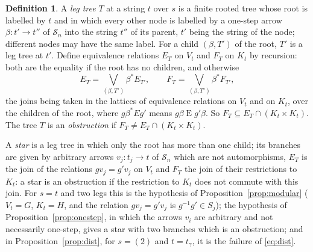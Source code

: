 \documentclass[11pt]{amsart}
\theoremstyle{definition}
\newtheorem{defi}[thm]{Definition}
\newcommand{\cS}{\mathcal S}
\begin{document}
\begin{defi}\label{def:tree}
A \emph{leg tree} $T$ at a string $t$ over $s$ is a finite rooted tree
whose root is labelled by $t$ and in which every other node is
labelled by a one-step arrow $\beta\colon t'\to t''$ of $\cS_n$ into
the string $t''$ of its parent, $t'$ being the string of the node;
different nodes may have the same label. For a child $(\beta,T')$ of
the root, $T'$ is a leg tree at $t'$. Define equivalence relations
$E_T$ on $V_t$ and $F_T$ on $K_t$ by recursion: both are the equality
if the root has no children, and otherwise
\[
E_T=\bigvee_{(\beta,T')}\beta^*E_{T'},\qquad
F_T=\bigvee_{(\beta,T')}\beta^*F_{T'},
\]
the joins being taken in the lattices of equivalence relations on
$V_t$ and on $K_t$, over the children of the root, where $g\mathrel{
\beta^*E}g'$ means $g\beta\mathrel Eg'\beta$. So $F_T\subseteq E_T\cap
(K_t\times K_t)$. The tree $T$ is an \emph{obstruction} if
$F_T\ne E_T\cap(K_t\times K_t)$.
\end{defi}

A \emph{star} is a leg tree in which only the root has more than one
child; its branches are given by arbitrary arrows $v_j\colon t_j\to t$
of $\cS_n$ which are not automorphisms, $E_T$ is the join of the
relations $gv_j=g'v_j$ on $V_t$ and $F_T$ the join of their
restrictions to $K_t$: a star is an obstruction if the restriction to
$K_t$ does not commute with this join. For $s=t$ and
two legs this is the hypothesis of Proposition~\ref{prop:modular}
($V_t=G$, $K_t=H$, and the relation $gv_j=g'v_j$ is
$g^{-1}g'\in S_j$); the hypothesis of
Proposition~\ref{prop:onestep}, in which the arrows $v_i$ are
arbitrary and not necessarily one-step, gives a star with two
branches which is an obstruction; and in
Proposition~\ref{prop:dist}, for $s=(2)$ and $t=t_\gamma$, it is the
failure of \eqref{eq:dist}.
\end{document}
